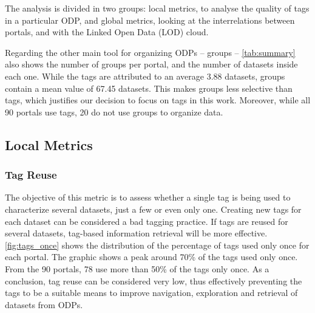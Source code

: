 \documentclass[conference]{IEEEtran}
\begin{document}
The analysis is divided in two groups: local metrics, to analyse the quality of tags in a particular ODP, and global metrics, looking at the interrelations between portals, and with the Linked Open Data (LOD) cloud.

Regarding the other main tool for organizing ODPs -- groups -- \autoref{tab:summary} also shows the number of groups per portal, and the number of datasets inside each one.
While the tags are attributed to an average 3.88 datasets, groups contain a mean value of 67.45 datasets.
This makes groups less selective than tags, which justifies our decision to focus on tags in this work.
Moreover, while all 90 portals use tags, 20 do not use groups to organize data.


\subsection{Local Metrics}
\label{sec:local_metrics}

\subsubsection{Tag Reuse}
The objective of this metric is to assess whether a single tag is being used to characterize several datasets, just a few or even only one.
Creating new tags for each dataset can be considered a bad tagging practice.
If tags are reused for several datasets, tag-based information retrieval will be more effective.
\autoref{fig:tags_once} shows the distribution of the percentage of tags used only once for each portal. 
The graphic shows a peak around 70\% of the tags used only once.
From the 90 portals, 78 use more than 50\% of the tags only once.
As a conclusion, tag reuse can be considered very low, thus effectively preventing the tags to be a suitable means to improve navigation, exploration and retrieval of datasets from ODPs.

\end{document}
